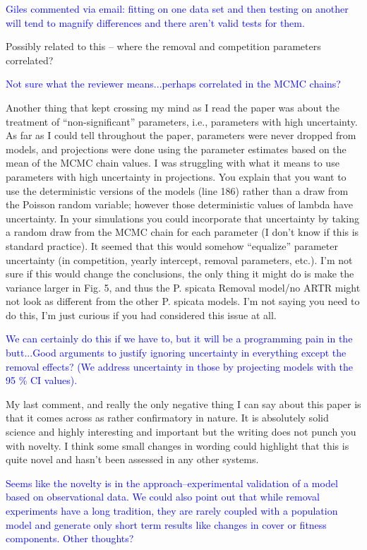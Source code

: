 \documentclass[12pt]{article}
\newcommand{\response}{\textcolor{blue}}
\begin{document}
{\response{Giles commented via email: fitting on one data set and then testing on another will tend to magnify differences and there aren’t valid tests for them. }

Possibly related to this – where the removal and competition parameters correlated?

\response{Not sure what the reviewer means...perhaps correlated in the MCMC chains?}

Another thing that kept crossing my mind as I read the paper was about the treatment of “non-significant” parameters, i.e., parameters with high uncertainty. As far as I could tell throughout the paper, parameters were never dropped from models, and projections were done using the parameter estimates based on the mean of the MCMC chain values. I was struggling with what it means to use parameters with high uncertainty in projections. You explain that you want to use the deterministic versions of the models (line 186) rather than a draw from the Poisson random variable; however those deterministic values of lambda have uncertainty. In your simulations you could incorporate that uncertainty by taking a random draw from the MCMC chain for each parameter (I don't know if this is standard practice). It seemed that this would somehow “equalize” parameter uncertainty (in competition, yearly intercept, removal parameters, etc.). I’m not sure if this would change the conclusions, the only thing it might do is make the variance larger in Fig. 5, and thus the P. spicata Removal model/no ARTR might not look as different from the other P. spicata models. I’m not saying you need to do this, I’m just curious if you had considered this issue at all.

\response{We can certainly do this if we have to, but it will be a programming pain in the butt...Good arguments to justify ignoring uncertainty in everything except the removal effects? (We address uncertainty in those by projecting models with the 95 \% CI values). }

My last comment, and really the only negative thing I can say about this paper is that it comes across as rather confirmatory in nature. It is absolutely solid science and highly interesting and important but the writing does not punch you with novelty. I think some small changes in wording could highlight that this is quite novel and hasn't been assessed in any other systems. 

\response{Seems like the novelty is in the approach--experimental validation of a model based on observational data. We could also point out that while 
removal experiments have a long tradition, they are rarely coupled with a population model and generate only short term results like changes in cover or 
fitness components. Other thoughts?}


}
\end{document}
